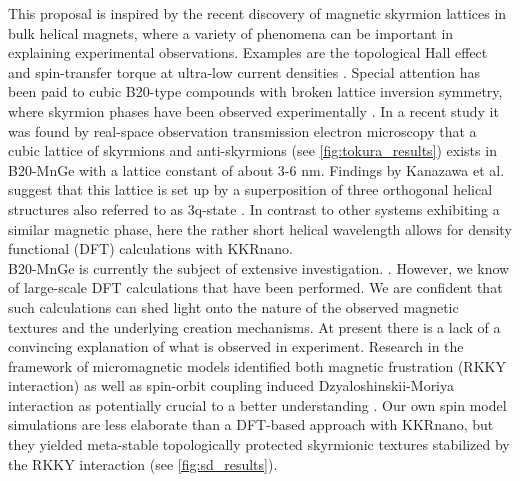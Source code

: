 \documentclass [a4paper, 12pt]{article}
\begin{document}
This proposal is inspired by the recent discovery of magnetic skyrmion lattices in bulk helical magnets,
where a variety of phenomena can be important in explaining experimental observations.
Examples are the topological Hall effect and spin-transfer torque at ultra-low current densities
\cite{kanazawa_large_2011}.
Special attention has been paid to cubic B20-type compounds with broken lattice inversion symmetry,
where skyrmion phases have been observed experimentally
\cite{nagaosa_topological_2013}.
In a recent study \cite{tanigaki_real-space_2015} 
it was found by real-space observation transmission electron microscopy 
that a cubic lattice of skyrmions and anti-skyrmions (see \cref{fig:tokura_results}) exists in B20-MnGe with
a lattice constant of about 3-6 nm. Findings by Kanazawa et al. suggest that this
lattice is set up by a superposition of three orthogonal helical
structures also referred to as 3q-state \cite{kanazawa_noncentrosymmetric_2017}.
In contrast to other systems exhibiting a similar magnetic phase,
here the rather short helical wavelength allows for density functional (DFT) calculations
with KKRnano. 
\\
B20-MnGe is currently the subject of extensive investigation.
\cite{kanazawa_large_2011,kanazawa_possible_2012,grigoriev_chiral_2013,tanigaki_real-space_2015,
martin_magnetic_2016}.
However, we know of large-scale DFT calculations that have been performed.
We are confident that such calculations can shed light onto the nature of
the observed magnetic textures and the underlying creation mechanisms.
At present there is a lack of a convincing explanation of what is observed in experiment. 
Research in the framework of micromagnetic models identified both magnetic frustration (RKKY interaction) 
as well as spin-orbit coupling induced Dzyaloshinskii-Moriya interaction as potentially
crucial to a better understanding \cite{altynbaev_hidden_2016,koretsune_control_2015}.
Our own spin model simulations are less elaborate than a DFT-based approach with KKRnano, but they
yielded meta-stable
topologically protected skyrmionic textures \cite{bornemann_investigation_2017} stabilized by the RKKY interaction
(see \cref{fig:sd_results}).
\end{document}
